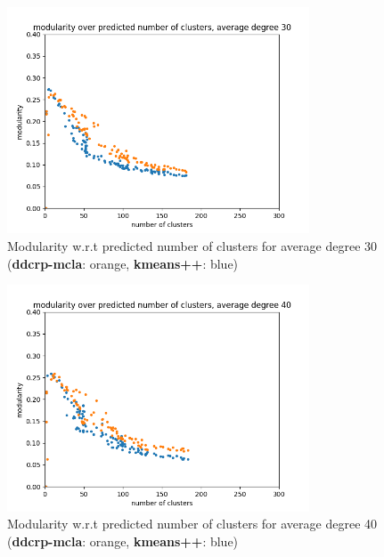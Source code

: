 \begin{figure}
    \centering
    \includegraphics[width=0.8\textwidth]{report/assets/results/modularity30.png}
    \caption{Modularity w.r.t predicted number of clusters for average degree 30 (\textbf{ddcrp-mcla}: orange, \textbf{kmeans++}: blue)}
    \label{fig:modularity30}
\end{figure}

\begin{figure}
    \centering
    \includegraphics[width=0.8\textwidth]{report/assets/results/modularity40.png}
    \caption{Modularity w.r.t predicted number of clusters for average degree 40 (\textbf{ddcrp-mcla}: orange, \textbf{kmeans++}: blue)}
    \label{fig:modularity40}
\end{figure}

